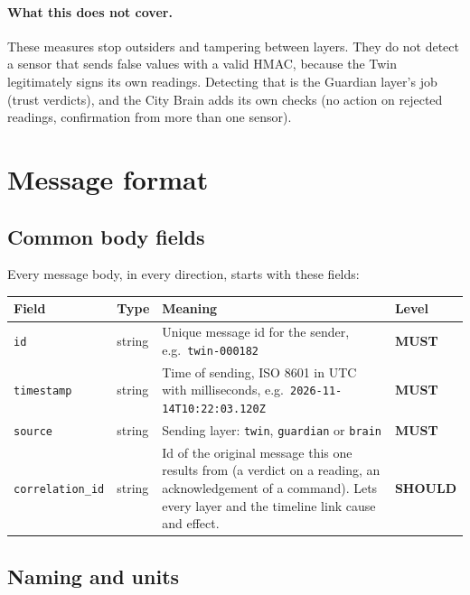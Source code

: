 \documentclass[11pt,a4paper]{article}
\newcommand{\code}[1]{\texttt{#1}}
\newcommand{\MUST}{\textbf{\textcolor{must}{MUST}}}
\newcommand{\SHOULD}{\textbf{\textcolor{should}{SHOULD}}}
\begin{document}
\paragraph{What this does not cover.} These measures stop outsiders and tampering between layers. They do not detect a sensor that sends false values with a valid HMAC, because the Twin legitimately signs its own readings. Detecting that is the Guardian layer's job (trust verdicts), and the City Brain adds its own checks (no action on rejected readings, confirmation from more than one sensor).

\section{Message format}
\label{sec:msg}

\subsection{Common body fields}

Every message body, in every direction, starts with these fields:

\begin{tabularx}{\linewidth}{@{}l l Y l@{}}
\toprule
\textbf{Field} & \textbf{Type} & \textbf{Meaning} & \textbf{Level} \\
\midrule
\code{id} & string & Unique message id for the sender, e.g.\ \code{twin-000182} & \MUST \\
\code{timestamp} & string & Time of sending, ISO 8601 in UTC with milliseconds, e.g.\ \code{2026-11-14T10:22:03.120Z} & \MUST \\
\code{source} & string & Sending layer: \code{twin}, \code{guardian} or \code{brain} & \MUST \\
\code{correlation\_id} & string & Id of the original message this one results from (a verdict on a reading, an acknowledgement of a command). Lets every layer and the timeline link cause and effect. & \SHOULD \\
\bottomrule
\end{tabularx}

\subsection{Naming and units}
\end{document}
